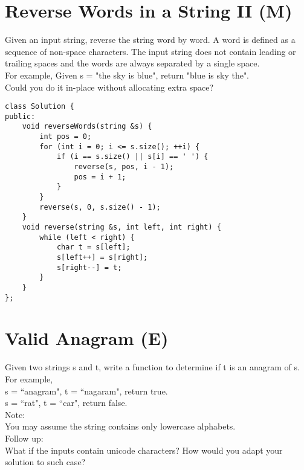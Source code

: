 \section{Reverse Words in a String II (M)}
Given an input string, reverse the string word by word. A word is defined as a sequence of non-space characters. The input string does not contain leading or trailing spaces and the words are always separated by a single space.\\

For example,
Given s = "the sky is blue",
return "blue is sky the".\\

Could you do it in-place without allocating extra space? \\

\begin{lstlisting}
class Solution {
public:
    void reverseWords(string &s) {
        int pos = 0;
        for (int i = 0; i <= s.size(); ++i) {
            if (i == s.size() || s[i] == ' ') {
                reverse(s, pos, i - 1);
                pos = i + 1;
            }
        }
        reverse(s, 0, s.size() - 1);
    }
    void reverse(string &s, int left, int right) {
        while (left < right) {
            char t = s[left];
            s[left++] = s[right];
            s[right--] = t;
        }
    }
};
\end{lstlisting}


\section{Valid Anagram (E)}
Given two strings s and t, write a function to determine if t is an anagram of s.\\

For example,\\
s = ``anagram", t = ``nagaram", return true.\\
s = ``rat", t = ``car", return false.\\

Note:\\
You may assume the string contains only lowercase alphabets.\\

Follow up:\\
What if the inputs contain unicode characters? How would you adapt your solution to such case?\\

